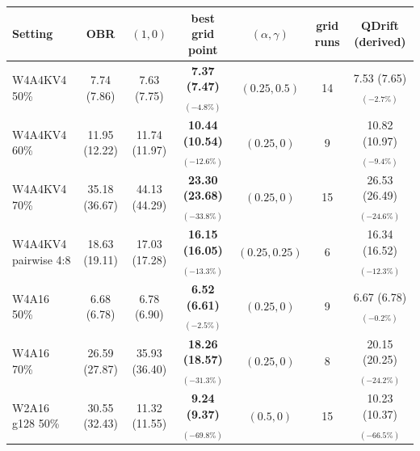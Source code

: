 \begin{tabular}{lcccccc}
\toprule
Setting & OBR & $(1,0)$ & best grid point & $(\alpha,\gamma)$ & grid runs & QDrift (derived) \\
\midrule
W4A4KV4 50\% & 7.74 (7.86) & 7.63 (7.75) & \textbf{7.37 (7.47)$_{(-4.8\%)}$} & $(0.25, 0.5)$ & 14 & 7.53 (7.65)$_{(-2.7\%)}$ \\
W4A4KV4 60\% & 11.95 (12.22) & 11.74 (11.97) & \textbf{10.44 (10.54)$_{(-12.6\%)}$} & $(0.25, 0)$ & 9 & 10.82 (10.97)$_{(-9.4\%)}$ \\
W4A4KV4 70\% & 35.18 (36.67) & 44.13 (44.29) & \textbf{23.30 (23.68)$_{(-33.8\%)}$} & $(0.25, 0)$ & 15 & 26.53 (26.49)$_{(-24.6\%)}$ \\
W4A4KV4 pairwise 4:8 & 18.63 (19.11) & 17.03 (17.28) & \textbf{16.15 (16.05)$_{(-13.3\%)}$} & $(0.25, 0.25)$ & 6 & 16.34 (16.52)$_{(-12.3\%)}$ \\
W4A16 50\% & 6.68 (6.78) & 6.78 (6.90) & \textbf{6.52 (6.61)$_{(-2.5\%)}$} & $(0.25, 0)$ & 9 & 6.67 (6.78)$_{(-0.2\%)}$ \\
W4A16 70\% & 26.59 (27.87) & 35.93 (36.40) & \textbf{18.26 (18.57)$_{(-31.3\%)}$} & $(0.25, 0)$ & 8 & 20.15 (20.25)$_{(-24.2\%)}$ \\
W2A16 g128 50\% & 30.55 (32.43) & 11.32 (11.55) & \textbf{9.24 (9.37)$_{(-69.8\%)}$} & $(0.5, 0)$ & 15 & 10.23 (10.37)$_{(-66.5\%)}$ \\
\bottomrule
\end{tabular}
